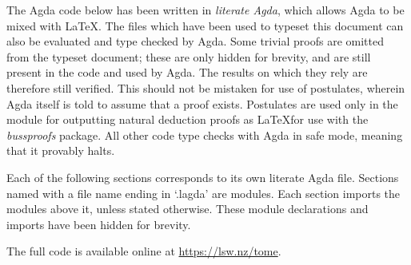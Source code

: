 
The Agda code below has been written in \emph{literate Agda}, which allows Agda
to be mixed with \LaTeX. The files which have been used to typeset this document
can also be evaluated and type checked by Agda. Some trivial proofs are omitted
from the typeset document; these are only hidden for brevity, and are still
present in the code and used by Agda. The results on which they rely are
therefore still verified. This should not be mistaken for use of postulates,
wherein Agda itself is told to assume that a proof exists. Postulates are used
only in the module for outputting natural deduction proofs as \LaTeX for use
with the \emph{bussproofs} package. All other code type checks with Agda in safe
mode, meaning that it provably halts.

Each of the following sections corresponds to its own literate Agda file.
Sections named with a file name ending in `.lagda' are modules. Each section
imports the modules above it, unless stated otherwise. These module declarations
and imports have been hidden for brevity.

The full code is available online at \url{https://lsw.nz/tome}. 

